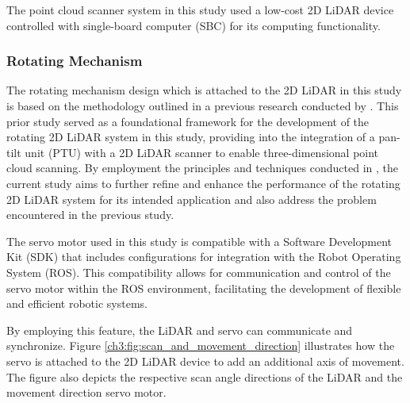 The point cloud scanner system in this study used a low-cost 2D LiDAR device controlled with single-board computer (SBC) for its computing functionality.

\subsubsection*{Rotating Mechanism}

The rotating mechanism design which is attached to the 2D LiDAR in this study is based on the methodology outlined in a previous research conducted by \citet{clar2022}. This prior study served as a foundational framework for the development of the rotating 2D LiDAR system in this study, providing into the integration of a pan-tilt unit (PTU) with a 2D LiDAR scanner to enable three-dimensional point cloud scanning. By employment the principles and techniques conducted in \citet{clar2022}, the current study aims to further refine and enhance the performance of the rotating 2D LiDAR system for its intended application and also address the problem encountered in the previous study.


The servo motor used in this study is compatible with a Software Development Kit (SDK) that includes configurations for integration with the Robot Operating System (ROS). This compatibility allows for communication and control of the servo motor within the ROS environment, facilitating the development of flexible and efficient robotic systems.

By employing this feature, the LiDAR and servo can communicate and synchronize. Figure \ref{ch3:fig:scan_and_movement_direction} illustrates how the servo is attached to the 2D LiDAR device to add an additional axis of movement. The figure also depicts the respective scan angle directions of the LiDAR and the movement direction servo motor.

